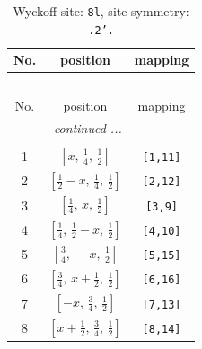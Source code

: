 \documentclass[fleqn,8pt]{jsarticle}
\begin{document}
\begin{longtable}{ccc}
\caption{Wyckoff site: {\tt 8l}, site symmetry: {\tt .2'.}}
 \\
 \hline \hline
No. & position & mapping \\ \hline \endfirsthead

\multicolumn{2}{l}{\tablename\ \thetable{}} \\
 \hline \hline
No. & position & mapping \\ \hline \endhead

 \hline \hline
\multicolumn{2}{r}{\footnotesize\it continued ...} \\ \endfoot

 \hline \hline
\multicolumn{2}{r}{} \\ \endlastfoot

1 & $\left[ x,\, \frac{1}{4},\, \frac{1}{2} \right]$ & {\tt [1,11]} \\ \hline
2 & $\left[ \frac{1}{2} - x,\, \frac{1}{4},\, \frac{1}{2} \right]$ & {\tt [2,12]} \\ \hline
3 & $\left[ \frac{1}{4},\, x,\, \frac{1}{2} \right]$ & {\tt [3,9]} \\ \hline
4 & $\left[ \frac{1}{4},\, \frac{1}{2} - x,\, \frac{1}{2} \right]$ & {\tt [4,10]} \\ \hline
5 & $\left[ \frac{3}{4},\, - x,\, \frac{1}{2} \right]$ & {\tt [5,15]} \\ \hline
6 & $\left[ \frac{3}{4},\, x + \frac{1}{2},\, \frac{1}{2} \right]$ & {\tt [6,16]} \\ \hline
7 & $\left[ - x,\, \frac{3}{4},\, \frac{1}{2} \right]$ & {\tt [7,13]} \\ \hline
8 & $\left[ x + \frac{1}{2},\, \frac{3}{4},\, \frac{1}{2} \right]$ & {\tt [8,14]} \\
\end{longtable}
\renewcommand{\arraystretch}{1.2}
\end{document}

